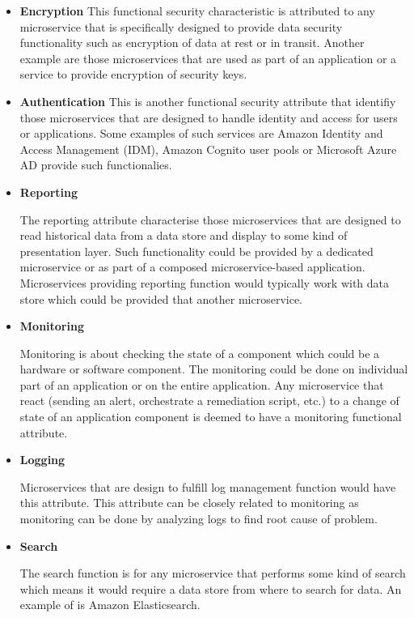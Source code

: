\documentclass{article}
\begin{document}
\begin{itemize}
\item \textbf{Encryption}
This functional security characteristic is attributed to any microservice that is specifically designed to provide data security functionality such as encryption of data at rest or in transit. Another example are those microservices that are used as part of an application or a service to provide encryption of security keys. 

\item \textbf{Authentication}
This is another functional security attribute that identifiy those microservices that are designed to handle identity and access for users or applications. Some examples of such services are Amazon Identity and Access Management (IDM), Amazon Cognito user pools or Microsoft Azure AD provide such functionalies.

\item \textbf{Reporting}

The reporting attribute characterise those microservices that are designed to read historical data from a data store and display to some kind of presentation layer. Such functionality could be provided by a dedicated microservice or as part of a composed microservice-based application. Microservices providing reporting function would typically work with data store which could be provided that another microservice.

\item \textbf{Monitoring} 

Monitoring is about checking the state of a component which could be a hardware or software component. The monitoring could be done on individual part of an application or on the entire application. Any microservice that react (sending an alert, orchestrate a remediation script, etc.) to a change of state of an application component is deemed to have a monitoring functional attribute.

\item \textbf{Logging}

Microservices that are design to fulfill log management function would have this attribute. This attribute can be closely related to monitoring as monitoring can be done by analyzing logs to find root cause of problem.

\item \textbf{Search}

The search function is for any microservice that performs some kind of search which means it would require a data store from where to search for data. An example of is Amazon Elasticsearch.


\end{itemize}
\end{document}
